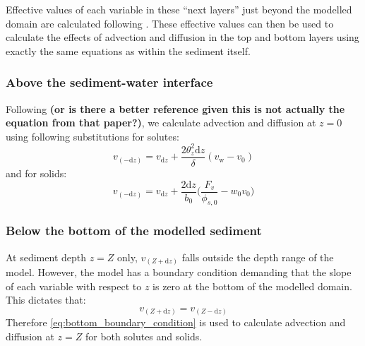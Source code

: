 \documentclass[a4paper]{article}
\newcommand{\D}[1]{\mathrm{d}#1}
\newcommand{\wtf}[1]{\textcolor{Cerulean}{\textbf{#1}}}
\begin{document}
Effective values of each variable in these ``next layers'' just beyond the modelled domain are calculated following \citet{boudreau_method--lines_1996}.  These effective values can then be used to calculate the effects of advection and diffusion in the top and bottom layers using exactly the same equations as within the sediment itself.


\subsubsection{Above the sediment-water interface}

Following \citet{boudreau_method--lines_1996} \wtf{(or is there a better reference given this is not actually the equation from that paper?)}, we calculate advection and diffusion at $z = 0$ using following substitutions for solutes:
\begin{equation}\label{Dv0}
v_{(-\D{z})} = v_{\D{z}} + \frac{2 \theta_z^2 \D{z}}{\delta} (v_\mathrm{w} - v_0)
\end{equation}
and for solids:
\begin{equation}
v_{(-\D{z})} = v_{\D{z}} + \frac{2 \D{z}}{b_0} \Bigg( \frac{F_v}{\phi_{s, 0}} - w_0 v_0 \Bigg)
\end{equation}


\subsubsection{Below the bottom of the modelled sediment}

At sediment depth $z = Z$ only, $v_{(Z+\D{z})}$ falls outside the depth range of the model.  However, the model has a boundary condition demanding that the slope of each variable with respect to $z$ is zero at the bottom of the modelled domain.  This dictates that:
\begin{equation}\label{eq:bottom_boundary_condition}
v_{(Z+\D{z})} = v_{(Z-\D{z})}
\end{equation}
Therefore \eqref{eq:bottom_boundary_condition} is used to calculate advection and diffusion at $z = Z$ for both solutes and solids.


\end{document}

